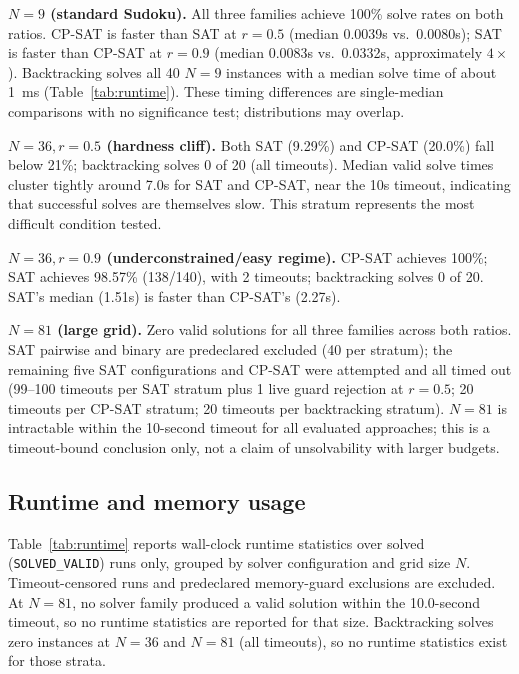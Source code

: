 \documentclass[a4paper,fleqn]{cas-sc}
\begin{document}
\textbf{\(N=9\) (standard Sudoku).} All three families achieve 100\% solve rates on both ratios. CP-SAT is faster than SAT at \(r=0.5\) (median 0.0039s vs.\ 0.0080s); SAT is faster than CP-SAT at \(r=0.9\) (median 0.0083s vs.\ 0.0332s, approximately \(4\times\)). Backtracking solves all 40 \(N=9\) instances with a median solve time of about 1~ms (Table~\ref{tab:runtime}). These timing differences are single-median comparisons with no significance test; distributions may overlap.

\textbf{\(N=36, r=0.5\) (hardness cliff).} Both SAT (9.29\%) and CP-SAT (20.0\%) fall below 21\%; backtracking solves 0 of 20 (all timeouts). Median valid solve times cluster tightly around 7.0s for SAT and CP-SAT, near the 10s timeout, indicating that successful solves are themselves slow. This stratum represents the most difficult condition tested.

\textbf{\(N=36, r=0.9\) (underconstrained/easy regime).} CP-SAT achieves 100\%; SAT achieves 98.57\% (138/140), with 2 timeouts; backtracking solves 0 of 20. SAT's median (1.51s) is faster than CP-SAT's (2.27s).

\textbf{\(N=81\) (large grid).} Zero valid solutions for all three families across both ratios. SAT pairwise and binary are predeclared excluded (40 per stratum); the remaining five SAT configurations and CP-SAT were attempted and all timed out (99--100 timeouts per SAT stratum plus 1 live guard rejection at \(r=0.5\); 20 timeouts per CP-SAT stratum; 20 timeouts per backtracking stratum). \(N=81\) is intractable within the 10-second timeout for all evaluated approaches; this is a timeout-bound conclusion only, not a claim of unsolvability with larger budgets.

\subsection{Runtime and memory usage}\label{sec:runtime}

Table~\ref{tab:runtime} reports wall-clock runtime statistics over solved (\texttt{SOLVED\_VALID}) runs only, grouped by solver configuration and grid size \(N\). Timeout-censored runs and predeclared memory-guard exclusions are excluded. At \(N=81\), no solver family produced a valid solution within the 10.0-second timeout, so no runtime statistics are reported for that size. Backtracking solves zero instances at \(N=36\) and \(N=81\) (all timeouts), so no runtime statistics exist for those strata.
\end{document}
